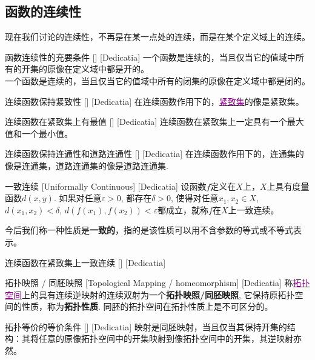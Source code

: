 \documentclass[UTF8]{ctexart}
\newcommand{\hyperrefc}[2]{\hyperref[#1]{\textcolor{purple}{#2}}}
\begin{document}
\subsection{函数的连续性}
现在我们讨论的连续性，不再是在某一点处的连续，而是在某个定义域上的连续。
\begin{thm}
    [UUID]
    {函数连续性的充要条件}
    []
    [Dedicatia]
    一个函数是连续的，当且仅当它的值域中所有的开集的原像在定义域中都是开的。\\
    一个函数是连续的，当且仅当它的值域中所有的闭集的原像在定义域中都是闭的。
\end{thm}
\begin{thm}
    [UUID]
    {连续函数保持紧致性}
    []
    [Dedicatia]
    在连续函数作用下的，\hyperrefc{dfn:Compactness}{紧致集}的像是紧致集。
\end{thm}
\begin{crl}
    [UUID]
    {连续函数在紧致集上有最值}
    []
    [Dedicatia]
    连续函数在紧致集上一定具有一个最大值和一个最小值。
\end{crl}
\begin{thm}
    [UUID]
    {连续函数保持连通性和道路连通性}
    []
    [Dedicatia]
    在连续函数作用下的，连通集的像是连通集，道路连通集的像是道路连通集.
\end{thm}
\begin{dfn}
    [UUID]
    {一致连续}
    [Uniformally Continuous]
    [Dedicatia]
    设函数$f$定义在$X$上，$X$上具有度量函数$d(x,y)$. 如果对任意$\varepsilon>0$, 都存在$\delta>0$, 使得对任意$x_1,x_2\in X$, $d(x_1,x_2)<\delta$, $d(f(x_1),f(x_2))<\varepsilon$都成立，就称$f$在$X$上一致连续。
\end{dfn}
今后我们称一种性质是\textbf{一致的}，指的是该性质可以用不含参数的等式或不等式表示。
\begin{thm}
    [UUID]
    {连续函数在紧致集上一致连续}
    []
    [Dedicatia]
\end{thm}
\begin{dfn}
    [UUID]
    {拓扑映照 / 同胚映照}
    [Topological Mapping / homeomorphism]
    [Dedicatia]
    称\hyperrefc{dfn:TopologicalSpace}{拓扑空间}上的具有连续逆映射的连续双射为一个\textbf{拓扑映照/同胚映照}, 它保持原拓扑空间的性质，称为\textbf{拓扑性质}. 同胚的拓扑空间在拓扑性质上是不可区分的。
\end{dfn}
\begin{crl}
    [UUID]
    {拓扑等价的等价条件}
    []
    [Dedicatia]
    映射是同胚映射，当且仅当其保持开集的结构：其将任意的原像拓扑空间中的开集映射到像拓扑空间中的开集，其逆映射亦然。
\end{crl}
\end{document}
